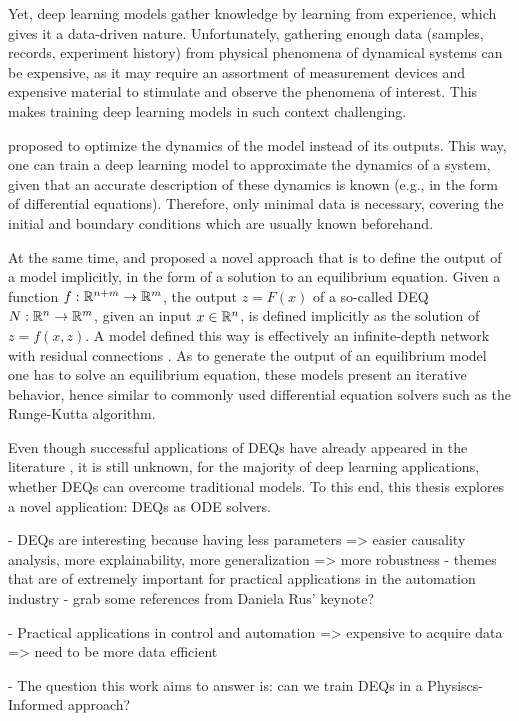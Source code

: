 Yet, deep learning models gather knowledge by learning from experience, which gives it a data-driven nature.
Unfortunately, gathering enough data (samples, records, experiment history) from physical phenomena of dynamical systems can be expensive, as it may require an assortment of measurement devices and expensive material to stimulate and observe the phenomena of interest.
This makes training deep learning models in such context challenging.

\textcite{Raissi2019} proposed to optimize the dynamics of the model instead of its outputs.
This way, one can train a deep learning model to approximate the dynamics of a system, given that an accurate description of these dynamics is known (e.g., in the form of differential equations).
Therefore, only minimal data is necessary, covering the initial and boundary conditions which are usually known beforehand.

At the same time, \textcite{Bai2019} and \textcite{Ghaoui2019} proposed a novel approach that is to define the output of a model implicitly, in the form of a solution to an equilibrium equation.
Given a function $f:\mathbb{R}^{n+m}\to\mathbb{R}^m$, the output $z = F(x)$ of a so-called \gls{DEQ} $N:\mathbb{R}^n\to \mathbb{R}^m$, given an input $x\in\mathbb{R}^n$, is defined implicitly as the solution of $z = f(x,z)$.
A model defined this way is effectively an infinite-depth network \cite{Bai2019} with residual connections \cite{he_deep_2016}.
As to generate the output of an equilibrium model one has to solve an equilibrium equation, these models present an iterative behavior, hence similar to commonly used differential equation solvers such as the Runge-Kutta algorithm.

Even though successful applications of \gls{DEQ}s have already appeared in the literature \cite{bai_multiscale_2020}, it is still unknown, for the majority of deep learning applications, whether \gls{DEQ}s can overcome traditional models. To this end, this thesis explores a novel application: \gls{DEQ}s as \gls{ODE} solvers.

- DEQs are interesting because having less parameters => easier causality analysis, more explainability, more generalization => more robustness
    - themes that are of extremely important for practical applications in the automation industry
    - grab some references from Daniela Rus' keynote?

- Practical applications in control and automation => expensive to acquire data => need to be more data efficient

- The question this work aims to answer is: can we train DEQs in a Physiscs-Informed approach?

